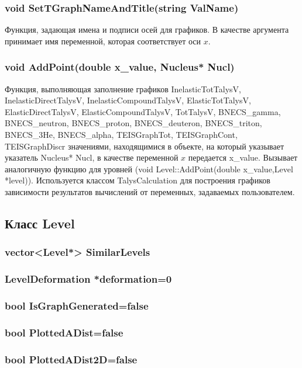 \documentclass[a4paper,12pt]{extarticle}
\begin{document}
\subsubsection{void SetTGraphNameAndTitle(string ValName)}
Функция, задающая имена и подписи осей для графиков. В качестве аргумента принимает имя переменной, которая соответствует оси $x$.
\subsubsection{void AddPoint(double x_value, Nucleus* Nucl)}
Функция, выполняющая заполнение графиков InelasticTotTalysV, InelasticDirectTalysV, InelasticCompoundTalysV, ElasticTotTalysV, ElasticDirectTalysV, ElasticCompoundTalysV, TotTalysV, BNECS_gamma, BNECS_neutron, BNECS_proton, BNECS_deuteron, BNECS_triton, BNECS_3He, BNECS_alpha, TEISGraphTot, TEISGraphCont, TEISGraphDiscr значениями, находящимися в объекте, на который указывает указатель Nucleus* Nucl, в качестве переменной $x$ передается x_value. Вызывает аналогичную функцию для уровней (void Level::AddPoint(double x_value,Level *level)). Используется классом TalysCalculation для построения графиков зависимости результатов вычислений от переменных, задаваемых пользователем.
\subsection{Класс Level}

\subsubsection{vector<Level*> SimilarLevels}

\subsubsection{LevelDeformation *deformation=0}

\subsubsection{bool IsGraphGenerated=false}

\subsubsection{bool PlottedADist=false}

\subsubsection{bool PlottedADist2D=false}
\end{document}
